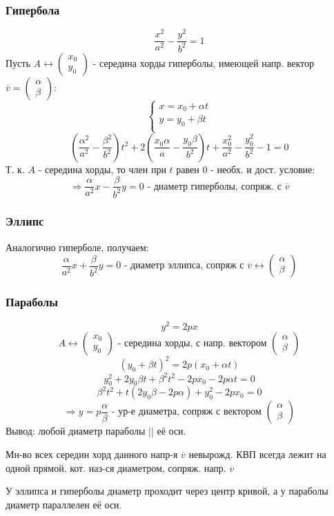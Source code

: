 \subsubsection{Гипербола}
\[
\frac{x^{2}}{a^{2}} - \frac{y^{2}}{b^{2}} = 1
\]
Пусть $A \underset{}{\longleftrightarrow} \begin{pmatrix}x_0 \\ y_0 \end{pmatrix}$ - середина хорды гиперболы, имеющей напр. вектор $\overline{v} = \begin{pmatrix}\alpha \\ \beta \end{pmatrix}$:
\[
\begin{cases}
x = x_0 + \alpha t\\
y = y_0 + \beta t \\
\end{cases}
\]
\[
\left(\frac{\alpha^{2}}{a^{2}} - \frac{\beta^{2}}{b^{2}}\right)t^{2} + 2\left(\frac{x_0\alpha}{a} - \frac{y_0\beta}{b^{2}}\right)t + \frac{x_0^{2}}{a^{2}} - \frac{y_0^{2}}{b^{2}} - 1 = 0
\]
Т. к. $A$ - середина хорды, то член при $t$ равен $0$ - необх. и дост. условие:
\[
\Rightarrow \frac{\alpha}{a^{2}}x - \frac{\beta}{b^{2}}y = 0 \text{ - диаметр гиперболы, сопряж. с $\overline{v}$}
\]
\subsubsection{Эллипс}
Аналогично гиперболе, получаем:
\[
\frac{\alpha}{a^{2}}x + \frac{\beta}{b^{2}}y = 0 \text{ - диаметр эллипса, сопряж с $\overline{v} \underset{}{\longleftrightarrow} \begin{pmatrix}\alpha \\ \beta \end{pmatrix}$}
\]
\subsubsection{Параболы}
\[
y^{2} = 2px
\]
\[
A \underset{}{\longleftrightarrow} \begin{pmatrix}x_0 \\ y_0 \end{pmatrix} \text{ - середина хорды, с напр. вектором } \begin{pmatrix}\alpha \\ \beta \end{pmatrix}
\]
\[
  (y_0 + \beta t)^{2} = 2p(x_0 + \alpha t)
\]
\[
  y_0^{2} + 2y_0\beta t + \beta^{2}t^{2} - 2px_0 - 2p\alpha t = 0
\]
\[
  \beta^{2}t^{2} + t(2y_0\beta - 2p\alpha) + y_0^{2} - 2px_0 = 0
\]
\[
\Rightarrow y = p\frac{\alpha}{\beta} \text{ - ур-е диаметра, сопряж с вектором $\begin{pmatrix}\alpha \\ \beta \end{pmatrix}$}
\]
Вывод: любой диаметр параболы || её оси.
\begin{theorem}
Мн-во всех середин хорд данного напр-я $\overline{v}$ невырожд. КВП всегда лежит на одной прямой, кот. наз-ся диаметром, сопряж. напр. $\overline{v}$
\end{theorem}
\begin{note}
У эллипса и гиперболы диаметр проходит через центр кривой, а у параболы диаметр параллелен её оси.
\end{note}
